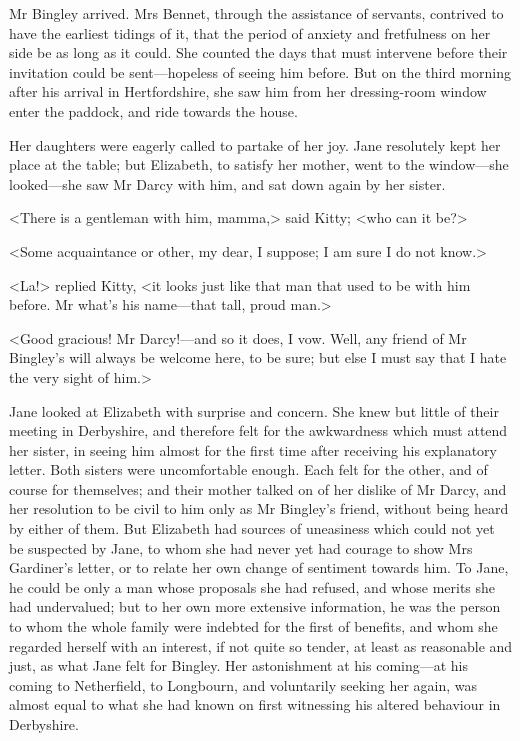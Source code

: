 Mr Bingley arrived. Mrs Bennet, through the assistance of servants, contrived to have the earliest tidings of it, that the period of anxiety and fretfulness on her side be as long as it could. She counted the days that must intervene before their invitation could be sent—hopeless of seeing him before. But on the third morning after his arrival in Hertfordshire, she saw him from her dressing-room window enter the paddock, and ride towards the house.

Her daughters were eagerly called to partake of her joy. Jane resolutely kept her place at the table; but Elizabeth, to satisfy her mother, went to the window—she looked—she saw Mr Darcy with him, and sat down again by her sister.

<There is a gentleman with him, mamma,> said Kitty; <who can it be?>

<Some acquaintance or other, my dear, I suppose; I am sure I do not know.>

<La!> replied Kitty, <it looks just like that man that used to be with him before. Mr what's his name—that tall, proud man.>

<Good gracious! Mr Darcy!—and so it does, I vow. Well, any friend of Mr Bingley's will always be welcome here, to be sure; but else I must say that I hate the very sight of him.>

Jane looked at Elizabeth with surprise and concern. She knew but little of their meeting in Derbyshire, and therefore felt for the awkwardness which must attend her sister, in seeing him almost for the first time after receiving his explanatory letter. Both sisters were uncomfortable enough. Each felt for the other, and of course for themselves; and their mother talked on of her dislike of Mr Darcy, and her resolution to be civil to him only as Mr Bingley's friend, without being heard by either of them. But Elizabeth had sources of uneasiness which could not yet be suspected by Jane, to whom she had never yet had courage to show Mrs Gardiner's letter, or to relate her own change of sentiment towards him. To Jane, he could be only a man whose proposals she had refused, and whose merits she had undervalued; but to her own more extensive information, he was the person to whom the whole family were indebted for the first of benefits, and whom she regarded herself with an interest, if not quite so tender, at least as reasonable and just, as what Jane felt for Bingley. Her astonishment at his coming—at his coming to Netherfield, to Longbourn, and voluntarily seeking her again, was almost equal to what she had known on first witnessing his altered behaviour in Derbyshire.

